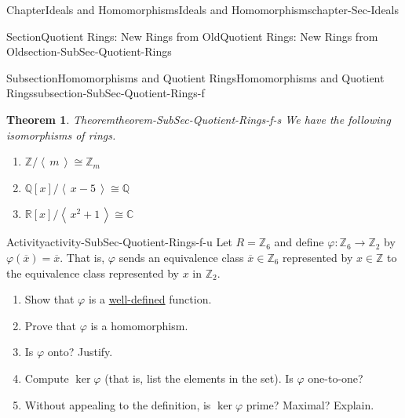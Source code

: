 \documentclass[oneside,10pt,]{book}
\newcommand{\xreffont}{\relax}
\numberwithin{equation}{section}
\providecommand\phantomsection{}
\newcommand{\ideal}[1]{\left\langle\, #1 \,\right\rangle}
\def\p{\varphi}
\def\C{{\mathbb C}}
\def\Z{{\mathbb Z}}
\def\Q{{\mathbb Q}}
\def\R{{\mathbb R}}
\newtheorem{theorem}{Theorem}[section]
\begin{document}
\begin{chapterptx}{Chapter}{Ideals and Homomorphisms}{}{Ideals and Homomorphisms}{}{}{chapter-Sec-Ideals}
\begin{sectionptx}{Section}{Quotient Rings: New Rings from Old}{}{Quotient Rings: New Rings from Old}{}{}{section-SubSec-Quotient-Rings}
\begin{subsectionptx}{Subsection}{Homomorphisms and Quotient Rings}{}{Homomorphisms and Quotient Rings}{}{}{subsection-SubSec-Quotient-Rings-f}
\begin{theorem}{Theorem}{}{}{theorem-SubSec-Quotient-Rings-f-s}
We have the following isomorphisms of rings.%
\begin{enumerate}
\item{}\(\displaystyle \Z/\ideal{m} \cong \Z_m\)%
\item{}\(\displaystyle \Q[x]/\ideal{x-5} \cong \Q\)%
\item{}\(\displaystyle \R[x]/\ideal{x^2+1} \cong \C\)%
\end{enumerate}
%
\end{theorem}
\begin{activity}{Activity}{}{activity-SubSec-Quotient-Rings-f-u}%
Let \(R = \Z_6\) and define \(\p : \Z_6 \to \Z_2\) by \(\p(\overline{x}) = \overline{x}\). That is, \(\p\) sends an equivalence class \(\overline{x}\in \Z_6\) represented by \(x\in \Z\) to the equivalence class represented by \(x\) in \(\Z_2\).%
%
\begin{enumerate}
\item{}Show that \(\p\) is a \hyperref[definition-def-well-defined]{well-defined} function.%
\item{}Prove that \(\p\) is a homomorphism.%
\item{}Is \(\p\) onto? Justify.%
\item{}Compute \(\ker\p\) (that is, list the elements in the set). Is \(\p\) one-to-one?%
\item{}Without appealing to the definition, is \(\ker\p\) prime? Maximal? Explain.%
\end{enumerate}
\end{activity}%
\end{subsectionptx}
\end{sectionptx}
\end{chapterptx}
%
\backmatter%
%
\clearpage\phantomsection%
%
%
{\xreffont\printindex}
%
\end{document}
